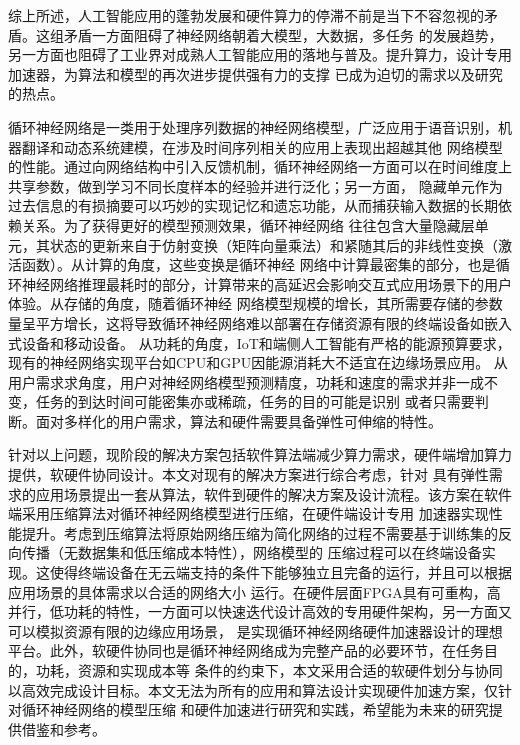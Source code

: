 综上所述，人工智能应用的蓬勃发展和硬件算力的停滞不前是当下不容忽视的矛盾。这组矛盾一方面阻碍了神经网络朝着大模型，大数据，多任务
的发展趋势，另一方面也阻碍了工业界对成熟人工智能应用的落地与普及。提升算力，设计专用加速器，为算法和模型的再次进步提供强有力的支撑
已成为迫切的需求以及研究的热点。

循环神经网络是一类用于处理序列数据的神经网络模型，广泛应用于语音识别，机器翻译和动态系统建模，在涉及时间序列相关的应用上表现出超越其他
网络模型的性能。通过向网络结构中引入反馈机制，循环神经网络一方面可以在时间维度上共享参数，做到学习不同长度样本的经验并进行泛化；另一方面，
隐藏单元作为过去信息的有损摘要可以巧妙的实现记忆和遗忘功能，从而捕获输入数据的长期依赖关系。为了获得更好的模型预测效果，循环神经网络
往往包含大量隐藏层单元，其状态的更新来自于仿射变换（矩阵向量乘法）和紧随其后的非线性变换（激活函数）。从计算的角度，这些变换是循环神经
网络中计算最密集的部分，也是循环神经网络推理最耗时的部分，计算带来的高延迟会影响交互式应用场景下的用户体验。从存储的角度，随着循环神经
网络模型规模的增长，其所需要存储的参数量呈平方增长，这将导致循环神经网络难以部署在存储资源有限的终端设备如嵌入式设备和移动设备。
从功耗的角度，IoT和端侧人工智能有严格的能源预算要求，现有的神经网络实现平台如CPU和GPU因能源消耗大不适宜在边缘场景应用。
从用户需求求角度，用户对神经网络模型预测精度，功耗和速度的需求并非一成不变，任务的到达时间可能密集亦或稀疏，任务的目的可能是识别
或者只需要判断。面对多样化的用户需求，算法和硬件需要具备弹性可伸缩的特性。

针对以上问题，现阶段的解决方案包括软件算法端减少算力需求，硬件端增加算力提供，软硬件协同设计。本文对现有的解决方案进行综合考虑，针对
具有弹性需求的应用场景提出一套从算法，软件到硬件的解决方案及设计流程。该方案在软件端采用压缩算法对循环神经网络模型进行压缩，在硬件端设计专用
加速器实现性能提升。考虑到压缩算法将原始网络压缩为简化网络的过程不需要基于训练集的反向传播（无数据集和低压缩成本特性），网络模型的
压缩过程可以在终端设备实现。这使得终端设备在无云端支持的条件下能够独立且完备的运行，并且可以根据应用场景的具体需求以合适的网络大小
运行。在硬件层面FPGA具有可重构，高并行，低功耗的特性，一方面可以快速迭代设计高效的专用硬件架构，另一方面又可以模拟资源有限的边缘应用场景，
是实现循环神经网络硬件加速器设计的理想平台。此外，软硬件协同也是循环神经网络成为完整产品的必要环节，在任务目的，功耗，资源和实现成本等
条件的约束下，本文采用合适的软硬件划分与协同以高效完成设计目标。本文无法为所有的应用和算法设计实现硬件加速方案，仅针对循环神经网络的模型压缩
和硬件加速进行研究和实践，希望能为未来的研究提供借鉴和参考。

